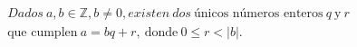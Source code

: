 \documentclass[preview]{standalone}
\begin{document}
\begin{align*}
Dados\ a, b \in \mathbb{Z}, b \neq 0, existen\ dos\ \text{únicos números enteros}\ q\ \text{y}\ r\\ \text{que cumplen} \ a = bq + r,\ \text{donde}\ 0 \leq r < |b|.
\end{align*}
\end{document}
